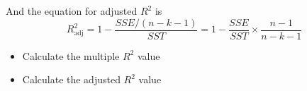 \documentclass[10pt]{article}\usepackage[]{graphicx}\usepackage[]{color}
\begin{document}
And the equation for adjusted $R^2$ is
\begin{equation*}
R^2_{\text{adj}}=1-\frac{SSE/(n-k-1)}{SST}=1-\frac{SSE}{SST}\times\frac{n-1}{n-k-1}
\end{equation*}

\begin{itemize}
  \itemsep0.5in
\item Calculate the multiple $R^2$ value
\item Calculate the adjusted $R^2$ value
\end{itemize}


\end{document}

